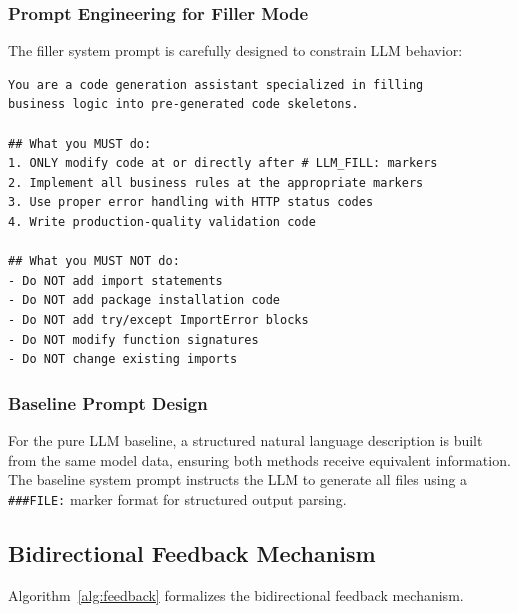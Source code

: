\documentclass[11pt,a4paper]{article}
\begin{document}
\subsubsection{Prompt Engineering for Filler Mode}

The filler system prompt is carefully designed to constrain LLM behavior:

\begin{lstlisting}[caption={Filler system prompt (excerpt)}, label={lst:prompt}]
You are a code generation assistant specialized in filling
business logic into pre-generated code skeletons.

## What you MUST do:
1. ONLY modify code at or directly after # LLM_FILL: markers
2. Implement all business rules at the appropriate markers
3. Use proper error handling with HTTP status codes
4. Write production-quality validation code

## What you MUST NOT do:
- Do NOT add import statements
- Do NOT add package installation code
- Do NOT add try/except ImportError blocks
- Do NOT modify function signatures
- Do NOT change existing imports
\end{lstlisting}

\subsubsection{Baseline Prompt Design}

For the pure LLM baseline, a structured natural language description is built from the same model data, ensuring both methods receive equivalent information. The baseline system prompt instructs the LLM to generate all files using a {\lstinline|###FILE:|} marker format for structured output parsing.

\subsection{Bidirectional Feedback Mechanism}

Algorithm~\ref{alg:feedback} formalizes the bidirectional feedback mechanism.
\end{document}
